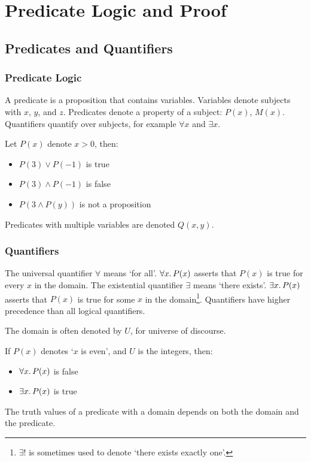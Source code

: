 \chapter{Predicate Logic and Proof}

\section{Predicates and Quantifiers}
\subsection{Predicate Logic}
A predicate is a proposition that contains variables. Variables denote subjects with \(x\), \(y\), and \(z\). Predicates denote a property of a subject: \(P(x)\), \(M(x)\). Quantifiers quantify over subjects, for example \(\forall x\) and \(\exists x\).

\begin{example}
    Let \(P(x)\) denote \(x > 0\), then:
    \begin{itemize}
        \item \(P(3) \lor P(-1)\) is true
        \item \(P(3) \land P(-1)\) is false
        \item \(P(3 \land P(y))\) is not a proposition
    \end{itemize}
\end{example}
Predicates with multiple variables are denoted \(Q(x, y)\).

\subsection{Quantifiers}
The universal quantifier \(\forall\) means `for all'. \(\forall x\ldotp P(x)\) asserts that \(P(x)\) is true for every \(x\) in the domain. The existential quantifier \(\exists\) means `there exists'. \(\exists x\ldotp P(x)\) asserts that \(P(x)\) is true for some \(x\) in the domain\footnote{\(\exists!\) is sometimes used to denote `there exists exactly one'.}. Quantifiers have higher precedence than all logical quantifiers.

The domain is often denoted by \(U\), for universe of discourse.

\begin{example}
    If \(P(x)\) denotes `\(x\) is even', and \(U\) is the integers, then:
    \begin{itemize}
        \item \(\forall x\ldotp P(x)\) is false
        \item \(\exists x\ldotp P(x)\) is true
    \end{itemize}
\end{example}
The truth values of a predicate with a domain depends on both the domain and the predicate.

